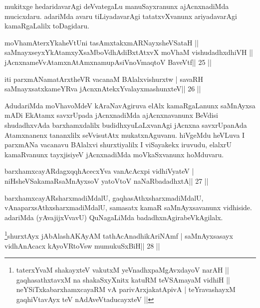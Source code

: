 \begin{artha}
mukitxge hedaridavarAgi deVvategaLu manuSayxranunx ajAcnxnadiMda mucicxdaru. adariMda avaru tiLiyadavarAgi tatatxvXvanunx ariyadavarAgi kamaRgaLalilx toDagidaru.
\end{artha}

\begin{shl}
moVhamAterxYkaheVtUni tasAmxtakxmARNayxsheVSataH ||
saMnayxseyxYkAtamxyXsaMboVdhAdiBxtAtxvX moVhaM vishudadhxdhiVH ||
jAcnxnameVvA\s\s tamxnA\s\s tAmxnamupAsiVnoV\s maqtoV BaveVtf\hfill || 25 ||
\end{shl}

\begin{shl}
iti parxmANamatArxtheVR vacanaM BAlalxvishurxtw |
savaRH saMnayxsatxkameYRva jAcnxnAtekxYvalayxmashunxteV\hfill || 26 ||
\end{shl}

\begin{artha}
AdudariMda moVhavoMdeV kAraNavAgiruva elAlx kamaRgaLanunx saMnAyxsa mADi EkAtamx savxrUpada jAcnxnadiMda ajAcnxnavanunx BeVdisi shudadhxvAda barxhamxdalilx budidhxyuLaLxvanAgi jAcnxna savxrUpanAda Atamxnanenx tananxlilx seVvisutAtx mukatxnAguvanu. hiVgeMdu heVLuva I parxmANa vacanavu BAlalxvi shurxtiyalilx I viSayakekx iruvudu, elalxrU kamaRvanunx tayxjisiyeV jAcnxnadiMda moVkaSxvanunx hoMduvaru.
\end{artha}


\begin{shl}
barxhamxcayARdagxqqhAcecxYva vanAcAcxpi vidhiVyateV |
niHsheVSakamaRsaMnAyxsoV yatoV\s toV naNaRbadadhxtA\hfill || 27 ||
\end{shl}

\begin{artha}
barxhamxcayARsharxmadiMdalU, gaqhasAthxsharxmadiMdalU,  vAnaparxsAthxsharxmadiMdalU, samasatx kamaR saMnAyxsavanunx vidhiside. adariMda (yAvajijxVvavU) QuNagaLiMda badadhxnAgirabeVkAgilalx.
\end{artha}

\begin{shl}
\footnote{taterxYvaM shakayxteV vakutxM yeV\s nadhxpaMgAvxdayoV
narAH || gaqhasathxtavxM na shakaSxyXnitx katuRM teVSAmayaM vidhiH ||
neYSiTxkabarxhamxcayaRM vA parivArxjakatA\s pivA | teYravashayxM
gaqhiVtavAyx teV nAdAveVtaducayxteV ||}shurxtAyx jAbAlashAKAyAM tathAcAnadhikAriNAmf |
saMnAyxsasayx vidhAnAcacx kAyoVR\s toV\s sw mumukuSxBiH\hfill || 28 ||
\end{shl}

